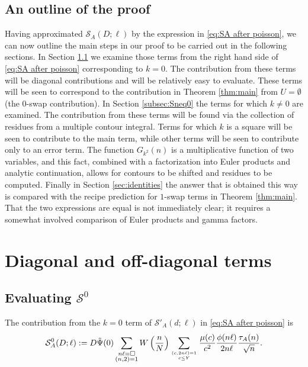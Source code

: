 \documentclass[12pt]{amsart}
\begin{document}
	\subsection{An outline of the proof}
	
	Having approximated $\mathcal S_A(D;\ell)$ by the expression in \eqref{eq:SA after poisson}, we can now outline the main steps in our proof to be carried out in the following sections. In Section \ref{subsec:S0} we examine those terms from the right hand side of \eqref{eq:SA after poisson} corresponding to $k=0$. The contribution from these terms will be diagonal contributions and will be relatively easy to evaluate. These terms will be seen to correspond to the contribution in Theorem \ref{thm:main} from $U = \emptyset$ (the 0-swap contribution). In Section \ref{subsec:Sneq0} the terms for which $k\neq 0$ are examined. The contribution from these terms will be found via the collection of residues from a multiple contour integral. Terms for which $k$ is a square will be seen to contribute to the main term, while other terms will be seen to contribute only to an error term. The function $G_{k^2}(n)$ is a multiplicative function of two variables, and this fact, combined with a factorization into Euler products and analytic continuation, allows for contours to be shifted and residues to be computed. Finally in Section \ref{sec:identities} the answer that is obtained this way is compared with the recipe prediction for $1$-swap terms in Theorem \ref{thm:main}. That the two expressions are equal is not immediately clear; it requires a somewhat involved comparison of Euler products and gamma factors.
	
	\section{Diagonal and off-diagonal terms}
	\label{sec:diagonal and offdiagonal}
	
	\subsection{Evaluating $\mathcal{S}^0$}
	\label{subsec:S0}
	
	The contribution from the $k=0$ term of $\mathcal S'_A(d;\ell)$ in \eqref{eq:SA after poisson} is 
	\begin{eqnarray*}
		\mathcal S_A^0(D;\ell):=D \tilde{\Psi}(0)\sum_{ \substack{ n\ell= \square  \\ (n,2)=1 }}W\left(\frac nN\right)  
		\sum_{(c,2n\ell)=1\atop c\le Y}\frac{\mu(c)}{c^2} \frac{\phi(n\ell)}{2n\ell}\frac{\tau_A(n)}{\sqrt{n}}.
	\end{eqnarray*}
	
\end{document}
